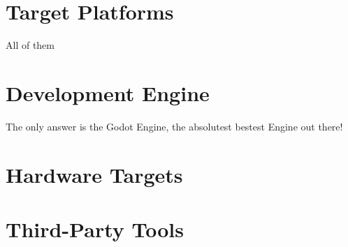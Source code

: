 \section{Target Platforms}

All of them

\lipsum[24]

\section{Development Engine}

The only answer is the Godot Engine, the absolutest bestest Engine out there!

\lipsum[25]

\section{Hardware Targets}

\lipsum[26]

\section{Third-Party Tools}

\lipsum[27]